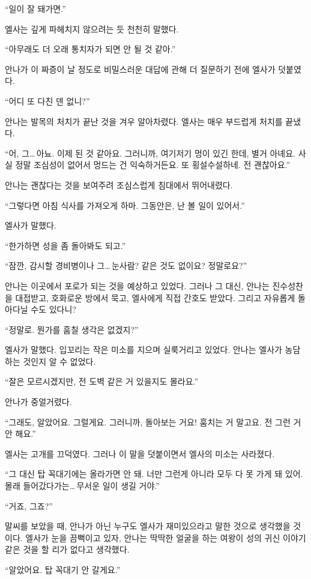 ``일이 잘 돼가면.''

엘사는 깊게 파헤치지 않으려는 듯 천천히 말했다.

``아무래도 더 오래 통치자가 되면 안 될 것 같아.''

안나가 이 짜증이 날 정도로 비밀스러운 대답에 관해 더 질문하기 전에 엘사가 덧붙였다.

``어디 또 다친 덴 없니?''

안나는 발목의 처치가 끝난 것을 겨우 알아차렸다. 엘사는 매우 부드럽게 처치를 끝냈다.

``어, 그\ldots\,아뇨. 이제 된 것 같아요. 그러니까, 여기저기 멍이 있긴 한데, 별거 아녜요. 사실 정말 조심성이 없어서 멍드는 건 익숙하거든요. 또 횡설수설하네. 전 괜찮아요.''

안나는 괜찮다는 것을 보여주려 조심스럽게 침대에서 뛰어내렸다.

``그렇다면 아침 식사를 가져오게 하마. 그동안은, 난 볼 일이 있어서.''

엘사가 말했다.

``한가하면 성을 좀 돌아봐도 되고.''

``잠깐, 감시할 경비병이나 그\ldots\,눈사람? 같은 것도 없이요? 정말로요?''

안나는 이곳에서 포로가 되는 것을 예상하고 있었다. 그러나 그 대신, 안나는 진수성찬을 대접받고, 호화로운 방에서 묵고, 엘사에게 직접 간호도 받았다. 그리고 자유롭게 돌아다닐 수도 있다니?

``정말로. 뭔가를 훔칠 생각은 없겠지?''

엘사가 말했다. 입꼬리는 작은 미소를 지으며 실룩거리고 있었다. 안나는 엘사가 농담하는 것인지 알 수 없었다.

``잘은 모르시겠지만, 전 도벽 같은 거 있을지도 몰라요.''

안나가 중얼거렸다.

``그래도, 알았어요. 그럴게요. 그러니까, 돌아보는 거요! 훔치는 거 말고요. 전 그런 거 안 해요.''

엘사는 고개를 끄덕였다. 그러나 이 말을 덧붙이면서 엘사의 미소는 사라졌다.

``그 대신 탑 꼭대기에는 올라가면 안 돼. 너만 그런게 아니라 모두 다 못 가게 돼 있어. 몰래 들어갔다가는\ldots\,무서운 일이 생길 거야.''

`` 거죠, 그죠?''

말씨를 보았을 때, 안나가 아닌 누구도 엘사가 재미있으라고 말한 것으로 생각했을 것이다. 엘사가 눈을 끔뻑이고 있자, 안나는 딱딱한 얼굴을 하는 여왕이 성의 귀신 이야기 같은 것을 할 리가 없다고 생각했다.

``알았어요. 탑 꼭대기 안 갈게요.''

